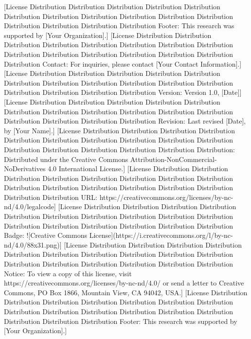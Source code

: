 [License Distribution Distribution Distribution Distribution Distribution Distribution Distribution Distribution Distribution Distribution Distribution Distribution Distribution Distribution Distribution Footer: This research was supported by [Your Organization].]  
[License Distribution Distribution Distribution Distribution Distribution Distribution Distribution Distribution Distribution Distribution Distribution Distribution Distribution Distribution Distribution Contact: For inquiries, please contact [Your Contact Information].]  
[License Distribution Distribution Distribution Distribution Distribution Distribution Distribution Distribution Distribution Distribution Distribution Distribution Distribution Distribution Distribution Version: Version 1.0, [Date]]  
[License Distribution Distribution Distribution Distribution Distribution Distribution Distribution Distribution Distribution Distribution Distribution Distribution Distribution Distribution Distribution Revision: Last revised [Date], by [Your Name].]  
[License Distribution Distribution Distribution Distribution Distribution Distribution Distribution Distribution Distribution Distribution Distribution Distribution Distribution Distribution Distribution Distribution: Distributed under the Creative Commons Attribution-NonCommercial-NoDerivatives 4.0 International License.]  
[License Distribution Distribution Distribution Distribution Distribution Distribution Distribution Distribution Distribution Distribution Distribution Distribution Distribution Distribution Distribution Distribution URL: https://creativecommons.org/licenses/by-nc-nd/4.0/legalcode]  
[License Distribution Distribution Distribution Distribution Distribution Distribution Distribution Distribution Distribution Distribution Distribution Distribution Distribution Distribution Distribution Distribution Badge: ![Creative Commons License](https://i.creativecommons.org/l/by-nc-nd/4.0/88x31.png)]  
[License Distribution Distribution Distribution Distribution Distribution Distribution Distribution Distribution Distribution Distribution Distribution Distribution Distribution Distribution Distribution Distribution Notice: To view a copy of this license, visit https://creativecommons.org/licenses/by-nc-nd/4.0/ or send a letter to Creative Commons, PO Box 1866, Mountain View, CA 94042, USA.]  
[License Distribution Distribution Distribution Distribution Distribution Distribution Distribution Distribution Distribution Distribution Distribution Distribution Distribution Distribution Distribution Distribution Footer: This research was supported by [Your Organization].]  
